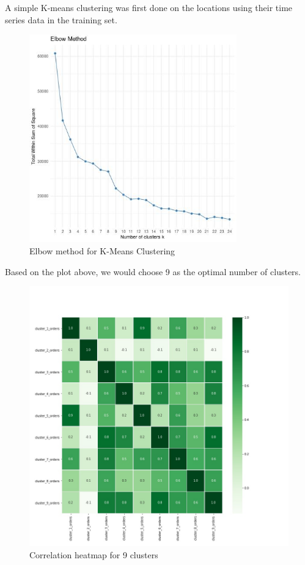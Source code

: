 \documentclass[12pt, letterpaper] {article}
\begin{document}
A simple K-means clustering was first done on the locations using their time series data in the training set.

\begin{figure}[H]
    \centering
    \includegraphics[width=0.8\textwidth, height=0.4\textheight]{Images/elbow.jpg}
    \caption{Elbow method for K-Means Clustering}
    \label{fig:Elbow method for K-Means Clustering}
\end{figure}

Based on the plot above, we would choose 9 as the optimal number of clusters. 

\begin{figure}[H]
    \centering
    \includegraphics[width=\textwidth, height=0.8\textheight]{Images/cluster_corr_heatmap.jpg}
    \caption{Correlation heatmap for 9 clusters}
    \label{fig:Correlation heatmap for 9 clusters}
\end{figure}
\end{document}
